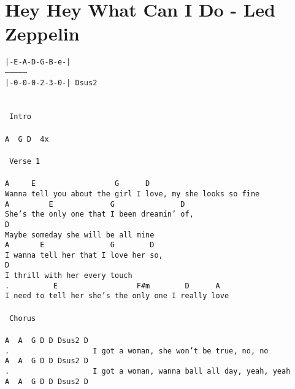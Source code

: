 \newpage
\section{Hey Hey What Can I Do - Led Zeppelin}
\label{Hey Hey What Can I Do - Led Zeppelin}
\texttt{|-E-A-D-G-B-e-|\\
---------------\\
|-0-0-0-2-3-0-| Dsus2\\
\\
\\
\lbrack\ Intro\rbrack\\
\\
A\ \ G\ D\ \ 4x\\
\\
\lbrack\ Verse\ 1\rbrack\\
\\
A\ \ \ \ \ E\ \ \ \ \ \ \ \ \ \ \ \ \ \ \ \ \ \ G\ \ \ \ \ \ D\\
Wanna\ tell\ you\ about\ the\ girl\ I\ love,\ my\ she\ looks\ so\ fine\\
A\ \ \ \ \ \ \ \ \ E\ \ \ \ \ \ \ \ \ \ \ \ \ G\ \ \ \ \ \ \ \ \ \ \ \ \ \ \ D\\
She's\ the\ only\ one\ that\ I\ been\ dreamin'\ of,\\
D\\
Maybe\ someday\ she\ will\ be\ all\ mine\\
A\ \ \ \ \ \ \ E\ \ \ \ \ \ \ \ \ \ \ \ \ \ \ G\ \ \ \ \ \ \ \ D\\
I\ wanna\ tell\ her\ that\ I\ love\ her\ so,\\
D\\
I\ thrill\ with\ her\ every\ touch\\
.\ \ \ \ \ \ \ \ \ \ E\ \ \ \ \ \ \ \ \ \ \ \ \ \ \ \ \ \ F\#m\ \ \ \ \ \ \ \ D\ \ \ \ \ \ A\\
I\ need\ to\ tell\ her\ she's\ the\ only\ one\ I\ really\ love\\
\\
\lbrack\ Chorus\rbrack\\
\\
A\ \ A\ \ G\ D\ D\ Dsus2\ D\ \ \ \ \ \ \ \ \ \ \ \ \ \ \ \\
.\ \ \ \ \ \ \ \ \ \ \ \ \ \ \ \ \ \ \ I\ got\ a\ woman,\ she\ won't\ be\ true,\ no,\ no\\
A\ \ A\ \ G\ D\ D\ Dsus2\ D\ \ \ \ \ \ \ \ \ \ \ \ \ \ \ \\
.\ \ \ \ \ \ \ \ \ \ \ \ \ \ \ \ \ \ \ I\ got\ a\ woman,\ wanna\ ball\ all\ day,\ yeah,\ yeah\\
A\ \ A\ \ G\ D\ D\ Dsus2\ D\ \ \ \ \ \ \ \ \ \ \ \ \ \ \ \\
}
